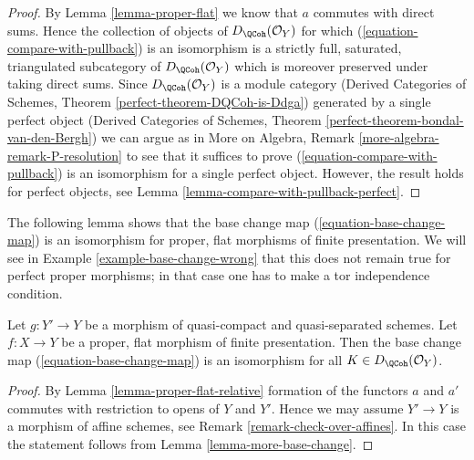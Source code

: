 \begin{proof}
By Lemma \ref{lemma-proper-flat} we know that $a$ commutes
with direct sums. Hence the collection of objects of
$D_\QCoh(\mathcal{O}_Y)$ for which (\ref{equation-compare-with-pullback})
is an isomorphism is a strictly full, saturated, triangulated
subcategory of $D_\QCoh(\mathcal{O}_Y)$ which is moreover
preserved under taking direct sums. Since $D_\QCoh(\mathcal{O}_Y)$
is a module category (Derived Categories of Schemes, Theorem
\ref{perfect-theorem-DQCoh-is-Ddga}) generated by a single
perfect object (Derived Categories of Schemes, Theorem
\ref{perfect-theorem-bondal-van-den-Bergh})
we can argue as in
More on Algebra, Remark \ref{more-algebra-remark-P-resolution}
to see that it suffices to prove (\ref{equation-compare-with-pullback})
is an isomorphism for a single perfect object.
However, the result holds for perfect objects, see
Lemma \ref{lemma-compare-with-pullback-perfect}.
\end{proof}

\noindent
The following lemma shows that the base change map
(\ref{equation-base-change-map}) is an isomorphism
for proper, flat morphisms of finite presentation.
We will see in
Example \ref{example-base-change-wrong}
that this does not remain true for perfect proper morphisms;
in that case one has to make a tor independence condition.

\begin{lemma}
\label{lemma-proper-flat-base-change}
Let $g : Y' \to Y$ be a morphism of quasi-compact and quasi-separated schemes.
Let $f : X \to Y$ be a proper, flat morphism of finite presentation.
Then the base change map (\ref{equation-base-change-map}) is an isomorphism
for all $K \in D_\QCoh(\mathcal{O}_Y)$.
\end{lemma}

\begin{proof}
By Lemma \ref{lemma-proper-flat-relative} formation of the
functors $a$ and $a'$ commutes with restriction to opens of $Y$ and $Y'$.
Hence we may assume $Y' \to Y$ is a morphism of affine schemes, see
Remark \ref{remark-check-over-affines}. In this
case the statement follows from Lemma \ref{lemma-more-base-change}.
\end{proof}

